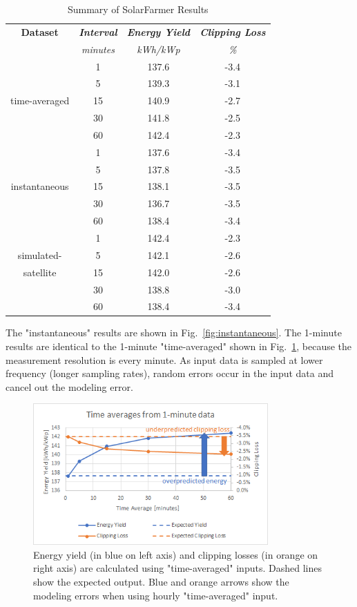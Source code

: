 \documentclass[conference]{IEEEtran}
\begin{document}
\begin{table}[htbp]
\caption{Summary of SolarFarmer Results}
\begin{center}
\begin{tabular}{|c|c|c|c|}
\hline
\textbf{Dataset} & \textbf{\textit{Interval}}& \textbf{\textit{Energy Yield}}& \textbf{\textit{Clipping Loss}} \\
                 & \textit{minutes}& \textit{kWh/kWp}& \textit{\%} \\
\hline
             &  1& 137.6& -3.4 \\
             &  5& 139.3& -3.1 \\
time-averaged& 15& 140.9& -2.7 \\
             & 30& 141.8& -2.5 \\
             & 60& 142.4& -2.3 \\
\hline
             &  1& 137.6& -3.4 \\
             &  5& 137.8& -3.5 \\
instantaneous& 15& 138.1& -3.5 \\
             & 30& 136.7& -3.5 \\
             & 60& 138.4& -3.4 \\
\hline
             &  1& 142.4& -2.3 \\
simulated-   &  5& 142.1& -2.6 \\
satellite    & 15& 142.0& -2.6 \\
             & 30& 138.8& -3.0 \\
             & 60& 138.4& -3.4 \\
\hline
\end{tabular}
\label{table:results-summary}
\end{center}
\end{table}

The "instantaneous" results are shown in Fig.~\ref{fig:instantaneous}. The 1-minute results are identical to the 1-minute "time-averaged" shown in Fig.~\ref{fig:time-averaged}, because the measurement resolution is every minute. As input data is sampled at lower frequency (longer sampling rates), random errors occur in the input data and cancel out the modeling error.

\begin{figure}[htbp]
\centerline{\includegraphics[width=9cm]{time-averaged.png}}
\caption{Energy yield (in blue on left axis) and clipping losses (in orange on right axis) are calculated using "time-averaged" inputs. Dashed lines show the expected output. Blue and orange arrows show the modeling errors when using hourly "time-averaged" input.}
\label{fig:time-averaged}
\end{figure}
\end{document}
